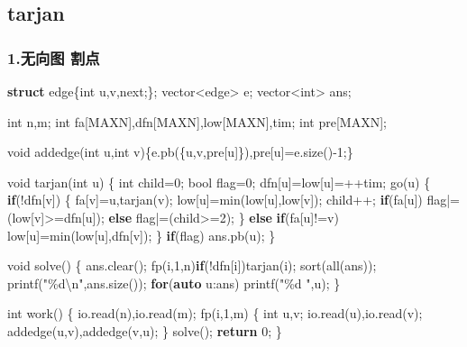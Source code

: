 \documentclass[
]{article}
\newenvironment{Shaded}{}{}
\newcommand{\ControlFlowTok}[1]{\textcolor[rgb]{0.00,0.44,0.13}{\textbf{#1}}}
\newcommand{\DataTypeTok}[1]{\textcolor[rgb]{0.56,0.13,0.00}{#1}}
\newcommand{\DecValTok}[1]{\textcolor[rgb]{0.25,0.63,0.44}{#1}}
\newcommand{\KeywordTok}[1]{\textcolor[rgb]{0.00,0.44,0.13}{\textbf{#1}}}
\newcommand{\NormalTok}[1]{#1}
\newcommand{\SpecialCharTok}[1]{\textcolor[rgb]{0.25,0.44,0.63}{#1}}
\newcommand{\StringTok}[1]{\textcolor[rgb]{0.25,0.44,0.63}{#1}}
\begin{document}
\hypertarget{tarjan}{%
\subsection{tarjan}\label{tarjan}}

\hypertarget{ux65e0ux5411ux56fe-ux5272ux70b9}{%
\subsubsection{1.无向图 割点}\label{ux65e0ux5411ux56fe-ux5272ux70b9}}

\begin{Shaded}
\begin{Highlighting}[]
\KeywordTok{struct}\NormalTok{ edge\{}\DataTypeTok{int}\NormalTok{ u,v,next;\};}
\NormalTok{vector\textless{}edge\textgreater{} e;}
\NormalTok{vector\textless{}}\DataTypeTok{int}\NormalTok{\textgreater{} ans;}

\DataTypeTok{int}\NormalTok{ n,m;}
\DataTypeTok{int}\NormalTok{ fa[MAXN],dfn[MAXN],low[MAXN],tim;}
\DataTypeTok{int}\NormalTok{ pre[MAXN];}

\DataTypeTok{void}\NormalTok{ addedge(}\DataTypeTok{int}\NormalTok{ u,}\DataTypeTok{int}\NormalTok{ v)\{e.pb(\{u,v,pre[u]\}),pre[u]=e.size(){-}}\DecValTok{1}\NormalTok{;\}}

\DataTypeTok{void}\NormalTok{ tarjan(}\DataTypeTok{int}\NormalTok{ u)}
\NormalTok{\{}
    \DataTypeTok{int}\NormalTok{ child=}\DecValTok{0}\NormalTok{;}
    \DataTypeTok{bool}\NormalTok{ flag=}\DecValTok{0}\NormalTok{;}
\NormalTok{    dfn[u]=low[u]=++tim;}
\NormalTok{    go(u)}
\NormalTok{    \{}
        \ControlFlowTok{if}\NormalTok{(!dfn[v])}
\NormalTok{        \{}
\NormalTok{            fa[v]=u,tarjan(v);}
\NormalTok{            low[u]=min(low[u],low[v]);}
\NormalTok{            child++;}
            \ControlFlowTok{if}\NormalTok{(fa[u]) flag|=(low[v]\textgreater{}=dfn[u]);}
            \ControlFlowTok{else}\NormalTok{ flag|=(child\textgreater{}=}\DecValTok{2}\NormalTok{);}
\NormalTok{        \}}
        \ControlFlowTok{else} \ControlFlowTok{if}\NormalTok{(fa[u]!=v) low[u]=min(low[u],dfn[v]);}
\NormalTok{    \}}
    \ControlFlowTok{if}\NormalTok{(flag) ans.pb(u);}
\NormalTok{\}}

\DataTypeTok{void}\NormalTok{ solve()}
\NormalTok{\{}
\NormalTok{    ans.clear();}
\NormalTok{    fp(i,}\DecValTok{1}\NormalTok{,n)}\ControlFlowTok{if}\NormalTok{(!dfn[i])tarjan(i);}
\NormalTok{    sort(all(ans));}
\NormalTok{    printf(}\StringTok{"}\SpecialCharTok{\%d\textbackslash{}n}\StringTok{"}\NormalTok{,ans.size());}
    \ControlFlowTok{for}\NormalTok{(}\KeywordTok{auto}\NormalTok{ u:ans) printf(}\StringTok{"}\SpecialCharTok{\%d}\StringTok{ "}\NormalTok{,u);}
\NormalTok{\}}

\DataTypeTok{int}\NormalTok{ work()}
\NormalTok{\{}
\NormalTok{    io.read(n),io.read(m);}
\NormalTok{    fp(i,}\DecValTok{1}\NormalTok{,m)}
\NormalTok{    \{}
        \DataTypeTok{int}\NormalTok{ u,v;}
\NormalTok{        io.read(u),io.read(v);}
\NormalTok{        addedge(u,v),addedge(v,u);}
\NormalTok{    \}}
\NormalTok{    solve();}
    \ControlFlowTok{return} \DecValTok{0}\NormalTok{;}
\NormalTok{\}}
\end{Highlighting}
\end{Shaded}
\end{document}
